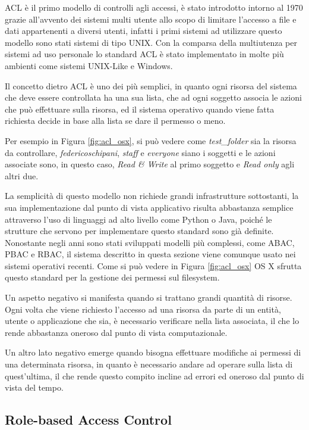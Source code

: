 \ac{ACL} è il primo modello di controlli agli accessi, è stato introdotto intorno al 1970 grazie all'avvento dei sistemi multi utente allo scopo di limitare l'accesso a file e dati appartenenti a diversi utenti, infatti i primi sistemi ad utilizzare questo modello sono stati sistemi di tipo UNIX. Con la comparsa della multiutenza per sistemi ad uso personale lo standard \ac{ACL} è stato implementato in molte più ambienti come sistemi UNIX-Like e Windows. \par
Il concetto dietro \ac{ACL} è uno dei più semplici, in quanto ogni risorsa del sistema che deve essere controllata ha una sua lista, che ad ogni soggetto associa le azioni che può effettuare sulla risorsa, ed il sistema operativo quando viene fatta richiesta decide in base alla lista se dare il permesso o meno. 


Per esempio in Figura \ref{fig:acl_osx}, si può vedere come \textit{test\_folder} sia la risorsa da controllare, \textit{federicoschipani}, \textit{staff} e \textit{everyone} siano i soggetti e le azioni associate sono, in questo caso, \textit{Read \& Write} al primo soggetto e \textit{Read only} agli altri due.


La semplicità di questo modello non richiede grandi infrastrutture sottostanti, la  sua implementazione dal punto di vista applicativo risulta abbastanza semplice attraverso l'uso di linguaggi ad alto livello come Python o Java, poiché le strutture che servono per implementare questo standard sono già definite.
Nonostante negli anni sono stati sviluppati modelli più complessi, come \ac{ABAC}, \ac{PBAC} e \ac{RBAC}, il sistema descritto in questa sezione viene comunque usato nei sistemi operativi recenti. Come si può vedere in Figura \ref{fig:acl_osx} OS X sfrutta questo standard per la gestione dei permessi sul filesystem. \par
Un aspetto negativo si manifesta quando si trattano grandi quantità di risorse. Ogni volta che viene richiesto l'accesso ad una risorsa da parte di un entità, utente o applicazione che sia, è necessario verificare nella lista associata, il che lo rende abbastanza oneroso dal punto di vista computazionale. \par
Un altro lato negativo emerge quando bisogna effettuare modifiche ai permessi di una determinata risorsa, in quanto è necessario andare ad operare sulla lista di quest'ultima, il che rende questo compito incline ad errori ed oneroso dal punto di vista del tempo.


\subsection*{Role-based Access Control} %
\label{sub:role_based_access_control}

